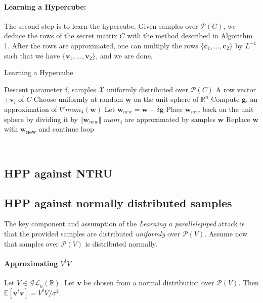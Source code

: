 \paragraph{Learning a Hypercube:}
The second step is to learn the hypercube. Given samples over $\mathcal{P}(\mathit{C})$, we deduce the rows of the secret matrix $\mathit{C}$ with the method described in Algorithm 1. After the rows are approximated,
one can multiply the rows $\{\mathbf{c}_1, ..., \mathbf{c}_2\}$ by $\mathit{L}^{-1}$ such that we have $\{\mathbf{v}_1, ..., \mathbf{v}_2\}$, and we are done.
\begin{algorithm}
    \caption{Learning a Hypercube}
    \begin{algorithmic}
        \Require Descent parameter $\delta$, samples $\mathcal{X}$ uniformly distributed over $\mathcal{P}(\mathit{C})$
        \Ensure A row vector $\pm \mathbf{v}_i$ of $\mathit{C}$
        \State Choose uniformly at random $\mathbf{w}$ on the unit sphere of $\mathbb{R}^n$
        \Loop
        \State Compute $\mathbf{g}$, an approximation of $\nabla mom_{4}(\mathbf{w})$
        \State Let $\mathbf{w}_{new} = \mathbf{w} - \delta \mathbf{g}$
        \State Place $\mathbf{w}_{new}$ back on the unit sphere by dividing it by $\left \Vert \mathbf{w}_{new} \right \Vert$
         \Comment $mom_4$ are approximated by samples 
            \State \Return $\mathbf{w}$
        \Else
            \State Replace $\mathbf{w}$ with $\mathbf{w_{new}}$ and continue loop
        \EndIf
        \EndLoop
    \end{algorithmic}
\end{algorithm}
\hfill \break \\
\subsection{HPP against NTRU}
\subsection{HPP against normally distributed samples}
The key component and assumption of the \textit{Learning a parallelepiped} attack is that the provided samples are distributed \textit{uniformly} over $\mathcal{P}(\mathit{V})$. 
Assume now that samples over $\mathcal{P}(\mathit{V})$ is distributed normally.

\paragraph{Approximating $\mathit{V}^t \mathit{V}$}
Let $\mathit{V} \in \mathcal{GL}_n(\mathbb{R})$. Let $\mathbf{v}$ be chosen from a normal distribution over $\mathcal{P}(\mathit{V})$. 
Then $\mathbb{E}[\mathbf{v}^t\mathbf{v}] = \mathit{V}^t \mathit{V}/\sigma^2$.\\

